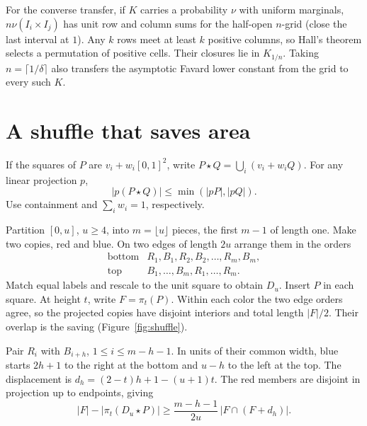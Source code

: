 \documentclass[11pt,reqno]{amsart}
\begin{document}
For the converse transfer, if $K$ carries a probability $\nu$ with uniform marginals, $n\nu(I_i\times I_j)$ has unit row and column sums for the half-open $n$-grid (close the last interval at $1$). Any $k$ rows meet at least $k$ positive columns, so Hall's theorem \cite{Hall} selects a permutation of positive cells. Their closures lie in $K_{1/n}$. Taking $n=\lceil1/\delta\rceil$ also transfers the asymptotic Favard lower constant from the grid to every such $K$.

\section{A shuffle that saves area}

If the squares of $P$ are $v_i+w_i[0,1]^2$, write $P\star Q=\bigcup_i(v_i+w_iQ)$. For any linear projection $p$,
\begin{equation}\label{eq:insert}
 |p(P\star Q)|\le\min(|pP|,|pQ|).
\end{equation}
Use containment and $\sum_i w_i=1$, respectively.

Partition $[0,u]$, $u\ge4$, into $m=\lfloor u\rfloor$ pieces, the first $m-1$ of length one. Make two copies, red and blue. On two edges of length $2u$ arrange them in the orders
\[
 \begin{array}{ll}
 \text{bottom}&R_1,B_1,R_2,B_2,\ldots,R_m,B_m,\\
 \text{top}&B_1,\ldots,B_m,R_1,\ldots,R_m .
 \end{array}
\]
Match equal labels and rescale to the unit square to obtain $D_u$. Insert $P$ in each square. At height $t$, write $F=\pi_t(P)$. Within each color the two edge orders agree, so the projected copies have disjoint interiors and total length $|F|/2$. Their overlap is the saving (Figure~\ref{fig:shuffle}).

Pair $R_i$ with $B_{i+h}$, $1\le i\le m-h-1$. In units of their common width, blue starts $2h+1$ to the right at the bottom and $u-h$ to the left at the top. The displacement is $d_h=(2-t)h+1-(u+1)t$. The red members are disjoint in projection up to endpoints, giving
\begin{equation}\label{eq:save}
 |F|-|\pi_t(D_u\star P)|\ge
 \frac{m-h-1}{2u}\,|F\cap(F+d_h)|.
\end{equation}
\end{document}
